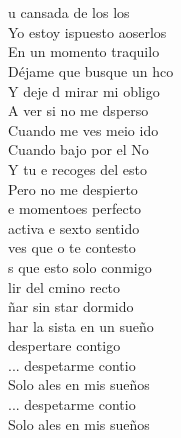 \begin{cancion}[Despertar][Estopa]%
{}\vspace*{-0.4cm}\\
	            \\
	   u cansada de los los\\
	 Yo estoy ispuesto aoserlos\\
	    En un momento traquilo\\
	Déjame que busque un hco\\
	Y deje d mirar mi obligo\\
	   A ver si no me dsperso\\
	    Cuando me ves meio ido\\
	Cuando bajo por el No\\
	Y tu e recoges del esto\\
	    Pero no me despierto\\
	e momentoes perfecto\\
	 activa e sexto sentido\\
	 ves que o te contesto\\
	s que esto solo conmigo\\
	lir del cmino recto\\
	ñar sin star dormido\\
	har la sista en un sueño\\
	 despertare contigo\\
	... despetarme contio\\
	Solo ales en mis sueños\\
	... despetarme contio\\
	Solo ales en mis sueños\\
	       \\
	\jump\\

\end{cancion}
